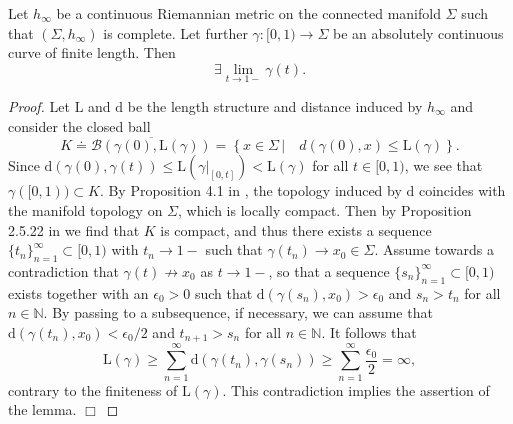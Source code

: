 \documentclass{article}
\begin{document}
\begin{lemma}\label{FinLLemma} Let $h_\infty$ be a continuous Riemannian metric on the connected manifold $\Sigma$ such that $(\Sigma,h_\infty)$ is complete. Let further $\gamma:[0,1)\to\Sigma$ be an absolutely continuous curve of finite length. Then
$$
\exists\lim\limits_{t\to1-}\gamma(t).
$$
\end{lemma}
\begin{proof} Let $\mathrm{L}$ and $\mathrm{d}$ be the length structure and distance induced by $h_\infty$ and consider the closed ball
$$
K\doteq\overline{\mathcal{B}(\gamma(0),\mathrm{L}(\gamma))}=\left\{x\in\Sigma\,{\big|}\quad d(\gamma(0),x)\le\mathrm{L}(\gamma)\right\}.
$$
Since $\mathrm{d}(\gamma(0),\gamma(t))\le\mathrm{L}(\gamma|_{[0,t]})<\mathrm{L}(\gamma)$ for all $t\in[0,1)$, we see that $\gamma([0,1))\subset K$. By Proposition 4.1 in \cite{Burtscher2015}, the topology induced by $\mathrm{d}$ coincides with the manifold topology on $\Sigma$, which is locally compact. Then by Proposition 2.5.22 in \cite{BuragoBuragoIvanov2001} we find that $K$ is compact, and thus there exists a sequence $\{t_n\}_{n=1}^\infty\subset[0,1)$ with $t_n\to 1-$ such that $\gamma(t_n)\to x_0\in\Sigma$. Assume towards a contradiction that $\gamma(t)\not\to x_0$ as $t\to1-$, so that a sequence $\{s_n\}_{n=1}^\infty\subset[0,1)$ exists together with an $\epsilon_0>0$ such that
$\mathrm{d}(\gamma(s_n),x_0)>\epsilon_0$ and $s_n>t_n$ for all $n\in\mathbb{N}$. By passing to a subsequence, if necessary, we can assume that $\mathrm{d}(\gamma(t_n),x_0)<\epsilon_0/2$ and $t_{n+1}>s_n$ for all $n\in\mathbb{N}$. It follows that
$$
\mathrm{L}(\gamma)\ge\sum\limits_{n=1}^\infty\mathrm{d}(\gamma(t_n),\gamma(s_n))\ge\sum\limits_{n=1}^\infty\frac{\epsilon_0}2=\infty,
$$
contrary to the finiteness of $\mathrm{L}(\gamma)$. This contradiction implies the assertion of the lemma. $\Box$
\end{proof}
\end{document}
